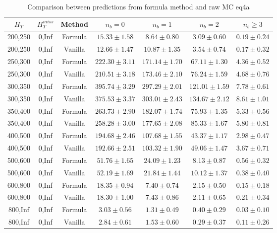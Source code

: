 \begin{longtable}{ | c | c | c | c | c | c | c | }
\caption{Comparison between predictions from formula method and raw MC eq4a} \label{tab:eq4a} \\    \hline 
$H_{T}$ & $H_{T}^{miss}$ & Method & $n_{b} = 0$ & $n_{b} = 1$ & $n_{b} = 2$ & $n_{b} \ge 3$ \\ \hline200,250 & 0,Inf & Formula  & $    15.33 \pm  1.58 $ & $     8.64 \pm  0.80 $ & $     3.09 \pm  0.60 $ & $     0.19 \pm  0.24 $  \\  
200,250 & 0,Inf & Vanilla  & $    12.66 \pm  1.47 $ & $    10.87 \pm  1.35 $ & $     3.54 \pm  0.74 $ & $     0.17 \pm  0.32 $  \\ \hline 
250,300 & 0,Inf & Formula  & $   222.30 \pm  3.11 $ & $   171.14 \pm  1.70 $ & $    67.11 \pm  1.30 $ & $     4.36 \pm  0.52 $  \\  
250,300 & 0,Inf & Vanilla  & $   210.51 \pm  3.18 $ & $   173.46 \pm  2.10 $ & $    76.24 \pm  1.59 $ & $     4.68 \pm  0.76 $  \\ \hline 
300,350 & 0,Inf & Formula  & $   395.74 \pm  3.29 $ & $   297.29 \pm  2.01 $ & $   121.01 \pm  1.59 $ & $     7.78 \pm  0.61 $  \\  
300,350 & 0,Inf & Vanilla  & $   375.53 \pm  3.37 $ & $   303.01 \pm  2.43 $ & $   134.67 \pm  2.12 $ & $     8.61 \pm  1.01 $  \\ \hline 
350,400 & 0,Inf & Formula  & $   263.73 \pm  2.90 $ & $   182.07 \pm  1.74 $ & $    75.93 \pm  1.35 $ & $     5.33 \pm  0.56 $  \\  
350,400 & 0,Inf & Vanilla  & $   258.28 \pm  3.00 $ & $   177.65 \pm  2.08 $ & $    85.33 \pm  1.67 $ & $     5.80 \pm  0.81 $  \\ \hline 
400,500 & 0,Inf & Formula  & $   194.68 \pm  2.46 $ & $   107.68 \pm  1.55 $ & $    43.37 \pm  1.17 $ & $     2.98 \pm  0.47 $  \\  
400,500 & 0,Inf & Vanilla  & $   192.66 \pm  2.51 $ & $   103.32 \pm  1.90 $ & $    49.06 \pm  1.47 $ & $     3.67 \pm  0.71 $  \\ \hline 
500,600 & 0,Inf & Formula  & $    51.76 \pm  1.65 $ & $    24.09 \pm  1.23 $ & $     8.13 \pm  0.87 $ & $     0.56 \pm  0.32 $  \\  
500,600 & 0,Inf & Vanilla  & $    52.19 \pm  1.69 $ & $    21.84 \pm  1.44 $ & $    10.12 \pm  1.37 $ & $     0.38 \pm  0.40 $  \\ \hline 
600,800 & 0,Inf & Formula  & $    18.35 \pm  0.94 $ & $     7.40 \pm  0.74 $ & $     2.15 \pm  0.50 $ & $     0.15 \pm  0.18 $  \\  
600,800 & 0,Inf & Vanilla  & $    18.30 \pm  1.00 $ & $     7.43 \pm  0.86 $ & $     2.11 \pm  0.65 $ & $     0.21 \pm  0.34 $  \\ \hline 
800,Inf & 0,Inf & Formula  & $     3.03 \pm  0.56 $ & $     1.31 \pm  0.49 $ & $     0.40 \pm  0.29 $ & $     0.03 \pm  0.10 $  \\  
800,Inf & 0,Inf & Vanilla  & $     2.84 \pm  0.61 $ & $     1.53 \pm  0.60 $ & $     0.29 \pm  0.37 $ & $     0.11 \pm  0.26 $  \\ \hline 
    \hline 
    \hline 
\end{longtable}

